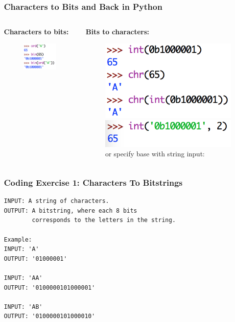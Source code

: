 \documentclass{beamer}
\newcommand{\<}{\langle}
\renewcommand{\>}{\rangle}
\begin{document}
\begin{frame}
\frametitle{Characters to Bits and Back in Python}

\begin{columns}
\begin{column}{0.5\textwidth}
\textbf{Characters to bits:}
\begin{figure}
\includegraphics[scale=.7]{IMG/py}
\end{figure}
\end{column}
\begin{column}{0.5\textwidth}
\textbf{Bits to characters:}
\begin{figure}
\includegraphics[scale=.7]{IMG/py2}
\caption{or specify base with string input:}
\includegraphics[scale=.6]{IMG/py3}
\end{figure}

\end{column}
\end{columns}
\end{frame}

\begin{frame}[fragile]
\frametitle{Coding Exercise 1: Characters To Bitstrings}

\begin{verbatim}
INPUT: A string of characters.
OUTPUT: A bitstring, where each 8 bits 
        corresponds to the letters in the string.

Example:
INPUT: 'A'
OUTPUT: '01000001'

INPUT: 'AA'
OUTPUT: '0100000101000001'

INPUT: 'AB'
OUTPUT: '0100000101000010'
\end{verbatim}
\end{frame}
\end{document}
